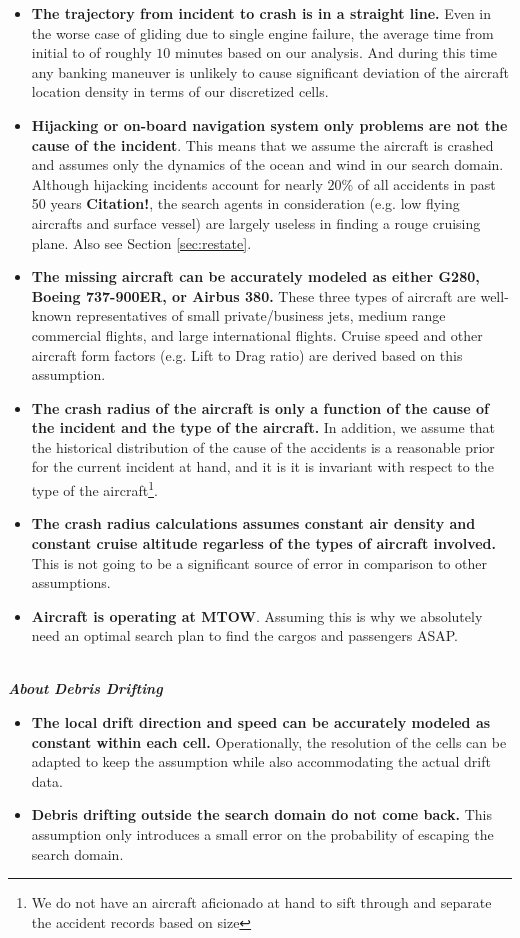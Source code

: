 \documentclass[12pt, letterpaper]{article}  %
\theoremstyle{definition}
\theoremstyle{remark}
\theoremstyle{plain}
\begin{document}
\begin{itemize}
\item \textbf{The trajectory from incident to crash is in a straight line.} Even in the worse case of gliding due to single engine failure, the average time from initial to of roughly $10$ minutes based on our analysis. And during this time any banking maneuver is unlikely to cause significant deviation of the aircraft location density in terms of our discretized cells.
\item \textbf{Hijacking or on-board navigation system only problems are not the cause of the incident}. This means that we assume the aircraft is crashed and assumes only the dynamics of the ocean and wind in our search domain. Although hijacking incidents account for nearly $20$\% of all accidents in past 50 years \textbf{Citation!}, the search agents in consideration (e.g. low flying aircrafts and surface vessel) are largely useless in finding a rouge cruising plane. Also see Section \ref{sec:restate}.
\item \textbf{The missing aircraft can be accurately modeled as either G280, Boeing 737-900ER, or Airbus 380.} These three types of aircraft are well-known representatives of small private/business jets, medium range commercial flights, and large international flights. Cruise speed and other aircraft form factors (e.g. Lift to Drag ratio) are derived based on this assumption.
\item \textbf{The crash radius of the aircraft is only a function of the cause of the incident and the type of the aircraft.} In addition, we assume that the historical distribution of the cause of the accidents is a reasonable prior for the current incident at hand, and it is it is invariant with respect to the type of the aircraft\footnote{We do not have an aircraft aficionado at hand to sift through and separate the accident records based on size}.
\item \textbf{The crash radius calculations assumes constant air density and constant cruise altitude regarless of the types of aircraft involved.} This is not going to be a significant source of error in comparison to other assumptions.
\item \textbf{Aircraft is operating at MTOW}. Assuming this is why we absolutely need an optimal search plan to find the cargos and passengers ASAP.
\end{itemize}

\ \\
\textit{\textbf{About Debris Drifting}}
\begin{itemize}
\item \textbf{The local drift direction and speed can be accurately modeled as constant within each cell.} Operationally, the resolution of the cells can be adapted to keep the assumption while also accommodating the actual drift data.
\item \textbf{Debris drifting outside the search domain do not come back.} This assumption only introduces a small error on the probability of escaping the search domain.
\end{itemize}
\end{document}
